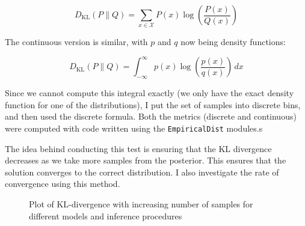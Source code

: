 $${D_{\text{KL}}(P\parallel Q)=\sum _{x\in {\mathcal {X}}}P(x)\log \left({\frac {P(x)}{Q(x)}}\right)}$$

The continuous version is similar, with $p$ and $q$ now being density functions:

$${D_\text{KL}}(P\parallel Q)=\int _{-\infty }^{\infty }p(x)\log \left({\frac {p(x)}{q(x)}}\right)\,dx$$

Since we cannot compute this integral exactly (we only have the exact density function for one of the distributions), I put the set of samples into discrete bins, and then used the discrete formula. Both the metrics (discrete and continuous) were computed with code written using the \texttt{EmpiricalDist} modules.s

The idea behind conducting this test is ensuring that the KL divergence decreases as we take more samples from the posterior. This ensures that the solution converges to the correct distribution. I also investigate the rate of convergence using this method.

\begin{figure}[!ht]
	\centering
	\caption{Plot of KL-divergence with increasing number of samples for different models and inference procedures}
	\label{fig:kl}
\end{figure}


